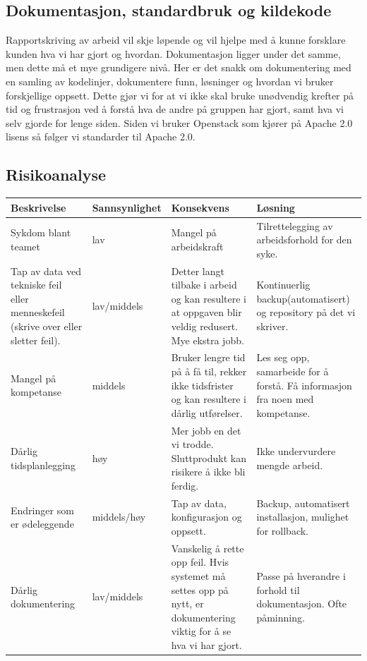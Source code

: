 \documentclass[12pt,a4paper]{article}
\begin{document}
\subsection{Dokumentasjon, standardbruk og kildekode}
Rapportskriving av arbeid vil skje løpende og vil hjelpe med å kunne forsklare kunden hva vi har gjort og hvordan. \newline \newline
Dokumentasjon ligger under det samme, men dette må et mye grundigere nivå. Her er det snakk om dokumentering med en samling av kodelinjer, dokumentere funn, løsninger og hvordan vi bruker forskjellige oppsett. Dette gjør vi for at vi ikke skal bruke unødvendig krefter på tid og frustrasjon ved å forstå hva de andre på gruppen har gjort, samt hva vi selv gjorde for lenge siden. \newline \newline
Siden vi bruker Openstack som kjører på Apache 2.0 lisens så følger vi standarder til Apache 2.0.


\newpage
\subsection{Risikoanalyse}
\begin{table}[h]
	\begin{tabular}[Figur 1]{| p{3cm} | p{3cm} | p{5cm} | p{5cm} |}
		\hline \rowcolor{lightgray} \textbf{Beskrivelse} & \textbf{Sannsynlighet} & \textbf{Konsekvens} & \textbf{Løsning} \\
		\hline \rowcolor{darkgray} Sykdom blant teamet & lav & Mangel på arbeidskraft & Tilrettelegging av arbeidsforhold for den syke. \\
		\hline \rowcolor{lightgray} Tap av data ved tekniske feil eller menneskefeil (skrive over eller sletter feil). &	lav/middels &	Detter langt tilbake i arbeid og kan resultere i at  oppgaven blir veldig redusert. Mye ekstra jobb. & Kontinuerlig backup(automatisert) og repository på det vi skriver. \\
		\hline \rowcolor{darkgray} Mangel på kompetanse &	middels & Bruker lengre tid på å få til, rekker ikke tidsfrister og kan resultere i dårlig utførelser. & Les seg opp, samarbeide for å forstå. Få  informasjon fra noen med kompetanse. \\
		\hline \rowcolor{lightgray} Dårlig tidsplanlegging & høy & Mer jobb en det vi trodde. Sluttprodukt kan risikere å ikke bli ferdig. & Ikke undervurdere mengde arbeid. \\
		\hline \rowcolor{darkgray} Endringer som er ødeleggende &	middels/høy	 & Tap av data, konfigurasjon og oppsett. & Backup, automatisert installasjon, mulighet for rollback. \\
		\hline \rowcolor{lightgray} Dårlig dokumentering & lav/middels & Vanskelig å rette opp feil. Hvis systemet må settes opp på nytt, er dokumentering viktig for å se hva vi har gjort. & Passe på hverandre i forhold til dokumentasjon. Ofte påminning.
	\end{tabular}
\end{table}
\end{document}
